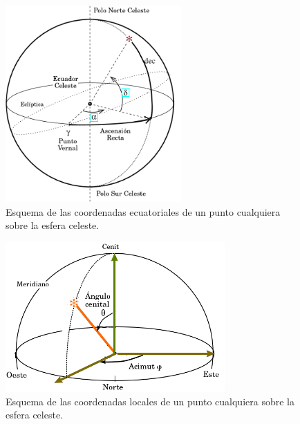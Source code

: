 \begin{figure}[H]
    \begin{small}
        \begin{center}
            \includegraphics[width=0.6\textwidth]{EC.png}
        \end{center}
        \caption{Esquema de las coordenadas ecuatoriales de un punto cualquiera sobre la esfera celeste.}
        \label{fig:}
    \end{small}
\end{figure}

\begin{figure}[H]
    \begin{small}
        \begin{center}
            \includegraphics[width=0.75\textwidth]{LC.png}
        \end{center}
        \caption{Esquema de las coordenadas locales de un punto cualquiera sobre la esfera celeste.}
        \label{fig:}
    \end{small}
\end{figure}

